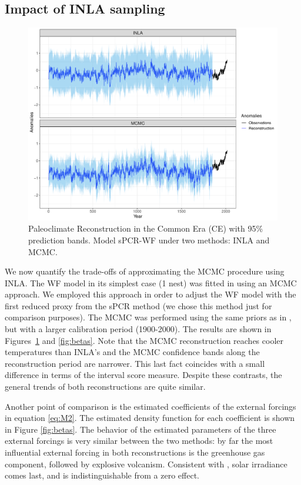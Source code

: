 \documentclass[12pt]{amsart}
\theoremstyle{plain}
\theoremstyle{definition}
\theoremstyle{remark}
\begin{document}
\subsection{Impact of INLA sampling}

\begin{figure}[h!]
  \centering
  \includegraphics[scale=0.40]{RecCE_MCMC}
  \caption{Paleoclimate Reconstruction in the Common Era (CE) with 95\%
    prediction bands. Model sPCR-WF under two methods: INLA and MCMC.}
  \label{fig:paleoCE4}
\end{figure}

We now quantify the trade-offs of approximating the MCMC procedure using INLA. The WF model in its simplest case (1 nest) was fitted in \cite{Barboza2014}
using an MCMC approach. We employed this approach in order to adjust the
WF model with the first reduced proxy from the sPCR method (we chose this method
just for comparison purposes). The MCMC was performed using the
same priors as in \cite{Barboza2014}, but with a larger calibration period
(1900-2000). The results are shown in Figures~\ref{fig:paleoCE4} and
\ref{fig:betas}. Note that the MCMC reconstruction reaches cooler temperatures
than INLA's and the MCMC confidence bands along the reconstruction period are
narrower. This last fact coincides with a small difference in terms of the
interval score measure. Despite these contrasts, the general trends of both reconstructions are quite similar. 

Another point of comparison is the estimated coefficients of the
external forcings in equation \eqref{eq:M2}. The estimated density function
for each coefficient is shown in Figure \ref{fig:betas}. The behavior of the
estimated parameters of the three external forcings is very similar between the
two methods: by far the most influential external forcing in
both reconstructions is the greenhouse gas component, followed by explosive volcanism. Consistent with \citet{Schurer2013b}, solar irradiance comes last, and is indistinguishable from a zero effect. 
\end{document}

